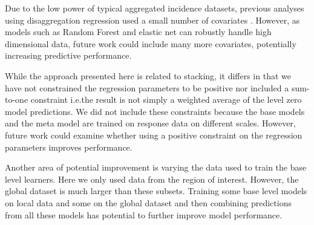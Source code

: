 \documentclass[11pt]{article}
\begin{document}
Due to the low power of typical aggregated incidence datasets, previous analyses using disaggregation regression used a small number of covariates \citep{sturrock2014fine}.
However, as models such as Random Forest and elastic net can robustly handle high dimensional data, future work could include many more covariates, potentially increasing predictive performance.




While the approach presented here is related to stacking, it differs in that we have not constrained the regression parameters to be positive nor included a sum-to-one constraint i.e.\thinspace the result is not simply a weighted average of the level zero model predictions.
We did not include these constraints because the base models and the meta model are trained on response data on different scales.
However, future work could examine whether using a positive constraint on the regression parameters improves performance.

Another area of potential improvement is varying the data used to train the base level learners.
Here we only used data from the region of interest.
However, the global dataset is much larger than these subsets.
Training some base level models on local data and some on the global dataset and then combining predictions from all these models has potential to further improve model performance.


 

\end{document}
